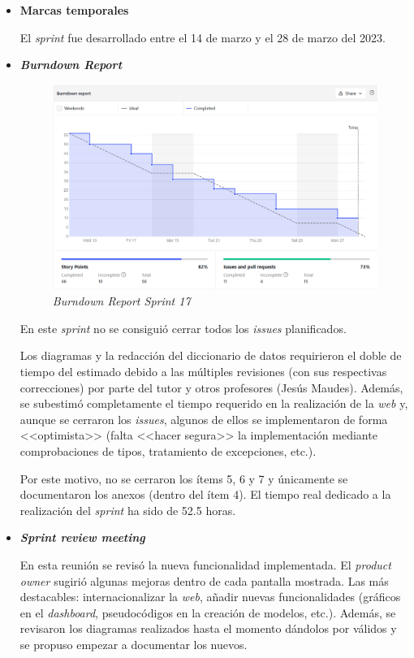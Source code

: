 \begin{itemize}
\begin{enumerate}
	\end{enumerate}
	\item \textbf{Marcas temporales}
	
	El \textit{sprint} fue desarrollado entre el 14 de marzo y el 28 de marzo del 2023.
	
	\item \textbf{\textit{Burndown Report}}
	
	\begin{figure}[h]
		\caption{\textit{Burndown Report Sprint 17}}
		\centering
		\includegraphics[width=\textwidth]{../img/anexos/bdr/s17_bdr}
	\end{figure}
	
	En este \textit{sprint} no se consiguió cerrar todos los \textit{issues} planificados.
	
	Los diagramas y la redacción del diccionario de datos requirieron el doble de tiempo del estimado debido a las múltiples revisiones (con sus respectivas correcciones) por parte del tutor y otros profesores (Jesús Maudes).  Además, se subestimó completamente el tiempo requerido en la realización de la \textit{web} y, aunque se cerraron los \textit{issues}, algunos de ellos se implementaron de forma <<optimista>> (falta <<hacer segura>> la implementación mediante comprobaciones de tipos, tratamiento de excepciones, etc.).
	
	Por este motivo, no se cerraron los ítems 5, 6 y 7 y únicamente se documentaron los anexos (dentro del ítem 4). El tiempo real dedicado a la realización del \textit{sprint} ha sido de 52.5 horas.
	
	\item \textbf{\textit{Sprint review meeting}}
	
	En esta reunión se revisó la nueva funcionalidad implementada. El \textit{product owner} sugirió algunas mejoras dentro de cada pantalla mostrada. Las más destacables: internacionalizar la \textit{web}, añadir nuevas funcionalidades (gráficos en el \textit{dashboard}, pseudocódigos en la creación de modelos, etc.). Además, se revisaron los diagramas realizados hasta el momento dándolos por válidos y se propuso empezar a documentar los nuevos.
	
\end{itemize}



